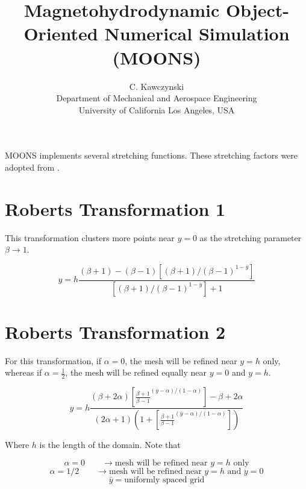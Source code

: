 \documentclass[11pt]{article}
\begin{document}
\doublespacing
\title{Magnetohydrodynamic Object-Oriented Numerical Simulation (MOONS)}
\author{C. Kawczynski \\
Department of Mechanical and Aerospace Engineering \\
University of California Los Angeles, USA\\
}
\maketitle

MOONS implements several stretching functions. These stretching factors were adopted from \cite{pletcher2012computational}.

\section{Roberts Transformation 1}

This transformation clusters more points near $y=0$ as the stretching parameter $\beta \rightarrow 1$.

\begin{equation}
	y
	=
	h
	\frac{(\beta+1)-(\beta-1) \left[ (\beta+1)/(\beta-1)^{1-\bar{y}} \right] }
	{\left[ (\beta+1)/(\beta-1)^{1-\bar{y}} \right]+1}
\end{equation}

\section{Roberts Transformation 2}
For this transformation, if $\alpha=0$, the mesh will be refined near $y=h$ only, whereas if $\alpha= \frac{1}{2}$, the mesh will be refined equally near $y=0$ and $y=h$.

\begin{equation}
	y 
	= 
	h 
	\frac{
	(\beta + 2 \alpha)
	\left[ \frac{\beta+1}{\beta-1}^{(\bar{y}-\alpha)/(1-\alpha)} \right] - \beta + 2 \alpha}
	{
	(2\alpha+1)
	\left(1+\left[ \frac{\beta+1}{\beta-1}^{(\bar{y}-\alpha)/(1-\alpha)} \right]
	\right)
	}
\end{equation}

Where $h$ is the length of the domain. Note that

\begin{equation}
	\alpha = 0 \qquad \rightarrow \text{mesh will be refined near $y=h$ only}
\end{equation}
\begin{equation}
	\alpha = 1/2 \qquad \rightarrow \text{mesh will be refined near $y=h$ and $y=0$}
\end{equation}
\begin{equation}
	\bar{y} = \text{uniformly spaced grid}
\end{equation}
\end{document}
